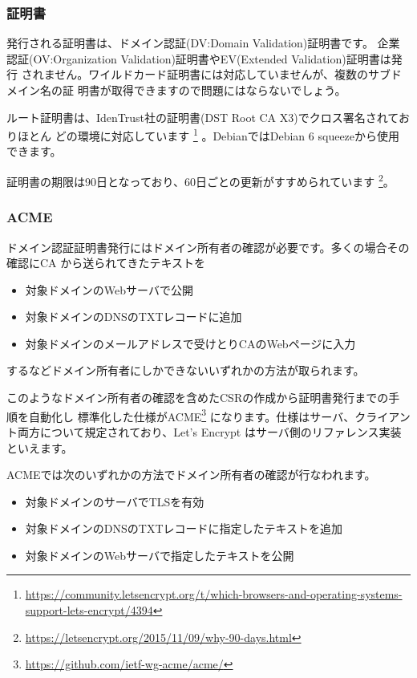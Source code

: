 \documentclass[mingoth,a4paper]{jsarticle}
\begin{document}
\subsubsection{証明書}

発行される証明書は、ドメイン認証(DV:Domain Validation)証明書です。
企業認証(OV:Organization Validation)証明書やEV(Extended Validation)証明書は発行
されません。ワイルドカード証明書には対応していませんが、複数のサブドメイン名の証
明書が取得できますので問題にはならないでしょう。

ルート証明書は、IdenTrust社の証明書(DST Root CA X3)でクロス署名されておりほとん
どの環境に対応しています
\footnote{\url{https://community.letsencrypt.org/t/which-browsers-and-operating-systems-support-lets-encrypt/4394}}
。DebianではDebian 6 squeezeから使用できます。

証明書の期限は90日となっており、60日ごとの更新がすすめられています
\footnote{\url{https://letsencrypt.org/2015/11/09/why-90-days.html}}。

\subsubsection{ACME}

ドメイン認証証明書発行にはドメイン所有者の確認が必要です。多くの場合その確認にCA
から送られてきたテキストを
\begin{itemize}
\item 対象ドメインのWebサーバで公開
\item 対象ドメインのDNSのTXTレコードに追加
\item 対象ドメインのメールアドレスで受けとりCAのWebページに入力
\end{itemize}
するなどドメイン所有者にしかできないいずれかの方法が取られます。

このようなドメイン所有者の確認を含めたCSRの作成から証明書発行までの手順を自動化し
標準化した仕様がACME\footnote{\url{https://github.com/ietf-wg-acme/acme/}}
になります。仕様はサーバ、クライアント両方について規定されており、Let's Encrypt
はサーバ側のリファレンス実装といえます。

ACMEでは次のいずれかの方法でドメイン所有者の確認が行なわれます。
\begin{itemize}
\item 対象ドメインのサーバでTLSを有効
\item 対象ドメインのDNSのTXTレコードに指定したテキストを追加
\item 対象ドメインのWebサーバで指定したテキストを公開
\end{itemize}
\end{document}
